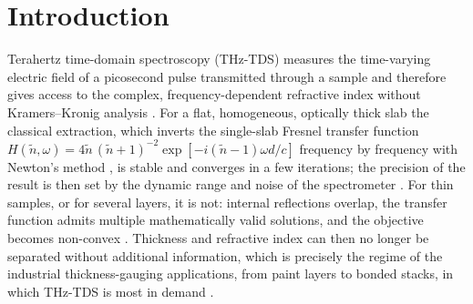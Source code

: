 \documentclass{optica-article}
\begin{document}
\begin{abstract}
thicknesses move along, but not out of, the optical-thickness valley. The analysis shows what a transmission measurement can and cannot determine, and which part of the misfit a dispersive model removes and which part it cannot.
\end{abstract}

\section{Introduction}
Terahertz time-domain spectroscopy (THz-TDS) measures the time-varying electric field of a picosecond pulse transmitted through a sample and therefore gives access to the complex, frequency-dependent refractive index without Kramers--Kronig analysis \cite{Grischkowsky1990,Duvillaret1996,Dorney2001,Pupeza2007,Naftaly2007,Neu2018}. For a flat, homogeneous, optically thick slab the classical extraction, which inverts the single-slab Fresnel transfer function $H(\tilde n,\omega)=4\tilde n\,(\tilde n+1)^{-2}\exp[-i(\tilde n-1)\omega d/c]$ frequency by frequency with Newton's method \cite{Duvillaret1996,Duvillaret1999,Withayachumnankul2014}, is stable and converges in a few iterations; the precision of the result is then set by the dynamic range and noise of the spectrometer \cite{Jepsen2005,Withayachumnankul2008,Naftaly2009}. For thin samples, or for several layers, it is not: internal reflections overlap, the transfer function admits multiple mathematically valid solutions, and the objective becomes non-convex \cite{Scheller2009,Scheller2014,Zhang2024}. Thickness and refractive index can then no longer be separated without additional information, which is precisely the regime of the industrial thickness-gauging applications, from paint layers to bonded stacks, in which THz-TDS is most in demand \cite{Yasui2005,Krimi2016,Naftaly2019}.
\end{document}
